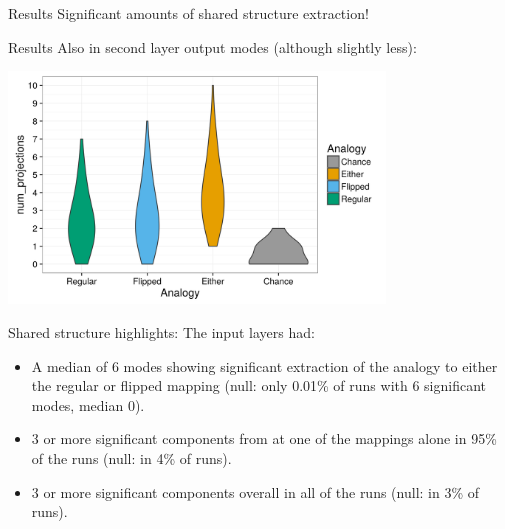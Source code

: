 \documentclass{beamer}
\begin{document}
\begin{frame}{Results}
Significant amounts of shared structure extraction!\\[11pt]
\end{frame}
\begin{frame}{Results}
Also in second layer output modes (although slightly less):
\begin{center}
\includegraphics[width=0.75\textwidth]{../hinton_family_tree/results/output_mode_projections_violin.png} 
\end{center}
\end{frame}

\begin{frame}{Shared structure highlights:}
The input layers had:
\begin{itemize}
    \item<1-> A median of 6 modes showing significant extraction of the analogy to either the regular or flipped mapping (null: only 0.01\% of runs with 6 significant modes, median 0).
    \item<2-> 3 or more significant components from at one of the mappings alone in 95\% of the runs (null: in 4\% of runs).
    \item<3-> 3 or more significant components overall in all of the runs (null: in 3\% of runs).
\end{itemize}
\end{frame}
\end{document}
